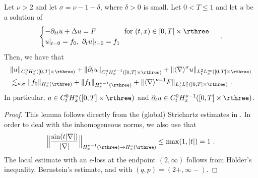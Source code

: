 \documentclass[11pt]{article}
\begin{document}
\begin{lem}\label{prelim:lem_strichartz}
Let \( \nu> 2 \) and let \( \sigma= \nu - 1 - \delta \), where \( \delta >0 \) is small. Let \( 0 < T \leq 1 \) and let \( u \) be a solution of 
\begin{equation}\label{prelim:eq_strichartz}
\begin{cases}
-\partial_{tt} u + \Delta u = F  \qquad\qquad \text{for} ~ (t,x)\in [0,T]\times \rthree \\
u|_{t=0}=f_0 , ~ \partial_t u|_{t=0}=f_1 
\end{cases}~.
\end{equation}
Then, we have that 
\begin{align*}
&\| u \|_{C_t^0 H_x^\nu([0,T]\times \rthree)}+\| \partial_t u \|_{C_t^0 H_x^{\nu-1}([0,T]\times \rthree)} + \| \langle \nabla \rangle^{\sigma} u \|_{L_t^2 L_x^\infty([0,T]\times \rthree)} \\
&\lesssim_{\nu,\sigma} \| f_0 \|_{H_x^\nu(\rthree)} + \| f_1 \|_{H_x^{\nu-1}(\rthree)} + \| \langle \nabla \rangle^{\nu-1} F \|_{L_t^1 L_x^2([0,T]\times \rthree)}~. 
\end{align*}
In particular, \( u \in C_t^0 H_x^\nu([0,T]\times \rthree) \) and \( \partial_t u \in C_t^0 H_x^{\nu-1}([0,T]\times \rthree) \). 
\end{lem}

\begin{proof}
This lemma follows directly from the (global) Strichartz estimates in \cite{KT98}. In order to deal with the inhomogeneous norms, we also use that 
\begin{equation*}
\Big \| \frac{\sin(t|\nabla|)}{|\nabla|} \Big \|_{H_x^{\nu-1}(\rthree) \rightarrow H_x^{\nu}(\rthree)} \leq \max( 1, |t|) = 1~. 
\end{equation*}
The local estimate with an \( \epsilon\)-loss at the endpoint \( (2,\infty) \) follows from Hölder's inequality, Bernstein's estimate, and \cite[Corollary 1.3]{KT98} with \( (q,p)=(2+,\infty-)\).  
\end{proof}
\end{document}
